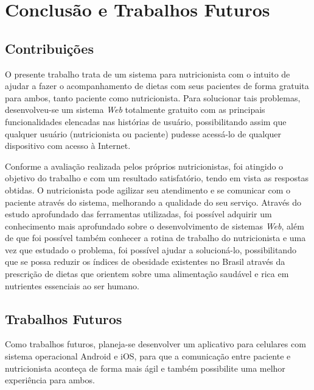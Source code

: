 \chapter{Conclusão e Trabalhos Futuros}


\section{Contribuições}

O presente trabalho trata de um sistema para nutricionista com o intuito de ajudar a fazer o acompanhamento de dietas com seus pacientes de forma gratuita para ambos, tanto paciente como nutricionista. 
Para solucionar tais problemas, desenvolveu-se um sistema \textit{Web} totalmente gratuito com as
principais funcionalidades elencadas nas histórias de usuário, possibilitando assim
que qualquer usuário (nutricionista ou paciente) pudesse acessá-lo de qualquer
dispositivo com acesso à Internet.

Conforme a avaliação realizada pelos próprios nutricionistas, foi atingido o objetivo do trabalho e com um resultado satisfatório, tendo em vista as respostas obtidas. O nutricionista pode agilizar seu atendimento e se comunicar com o 
paciente através do sistema, melhorando a qualidade do seu serviço. Através do estudo aprofundado das ferramentas utilizadas, foi possível adquirir um conhecimento mais aprofundado sobre o desenvolvimento de sistemas \textit{Web}, além de que foi possível também conhecer a rotina de trabalho do nutricionista e uma vez que estudado o problema, foi possível ajudar a solucioná-lo, possibilitando que se possa reduzir os índices de obesidade existentes no Brasil através da prescrição de dietas que orientem sobre uma alimentação saudável e rica em nutrientes essenciais ao ser humano.


\section{Trabalhos Futuros}
Como trabalhos futuros, planeja-se desenvolver um aplicativo para celulares com sistema operacional Android e iOS,
para que a comunicação entre paciente e nutricionista aconteça de forma mais ágil e também possibilite uma melhor
experiência para ambos.